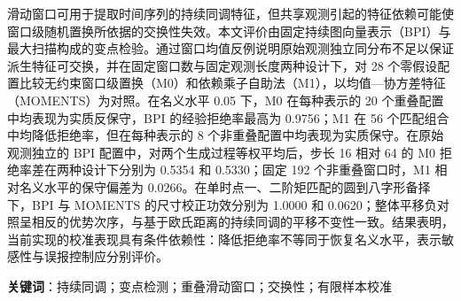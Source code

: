 滑动窗口可用于提取时间序列的持续同调特征，但共享观测引起的特征依赖可能使窗口级随机置换所依据的交换性失效。本文评价由固定持续图向量表示（BPI）与最大扫描构成的变点检验。通过窗口均值反例说明原始观测独立同分布不足以保证派生特征可交换，并在固定窗口数与固定观测长度两种设计下，对 28 个零假设配置比较无约束窗口级置换（M0）和依赖乘子自助法（M1），以均值—协方差特征（MOMENTS）为对照。在名义水平 0.05 下，M0 在每种表示的 20 个重叠配置中均表现为实质反保守，BPI 的经验拒绝率最高为 0.9756；M1 在 56 个匹配组合中均降低拒绝率，但在每种表示的 8 个非重叠配置中均表现为实质保守。在原始观测独立的 BPI 配置中，对两个生成过程等权平均后，步长 16 相对 64 的 M0 拒绝率差在两种设计下分别为 0.5354 和 0.5330；固定 192 个非重叠窗口时，M1 相对名义水平的保守偏差为 0.0266。在单时点一、二阶矩匹配的圆到八字形备择下，BPI 与 MOMENTS 的尺寸校正功效分别为 1.0000 和 0.0620；整体平移负对照呈相反的优势次序，与基于欧氏距离的持续同调的平移不变性一致。结果表明，当前实现的校准表现具有条件依赖性：降低拒绝率不等同于恢复名义水平，表示敏感性与误报控制应分别评价。

\noindent\textbf{关键词}：持续同调；变点检测；重叠滑动窗口；交换性；有限样本校准
